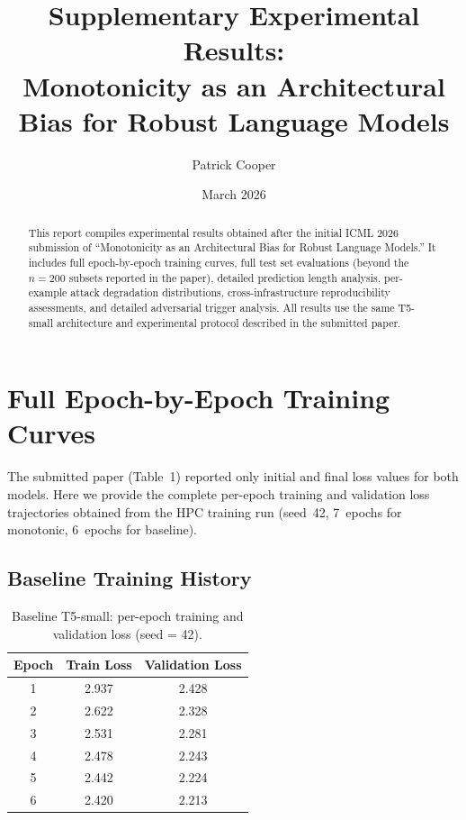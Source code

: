 \documentclass{article}
\title{Supplementary Experimental Results:\\Monotonicity as an Architectural Bias for Robust Language Models}
\author{Patrick Cooper}
\date{March 2026}
\begin{document}
\maketitle

\begin{abstract}
This report compiles experimental results obtained after the initial ICML 2026 submission of ``Monotonicity as an Architectural Bias for Robust Language Models.'' It includes full epoch-by-epoch training curves, full test set evaluations (beyond the $n=200$ subsets reported in the paper), detailed prediction length analysis, per-example attack degradation distributions, cross-infrastructure reproducibility assessments, and detailed adversarial trigger analysis. All results use the same T5-small architecture and experimental protocol described in the submitted paper.
\end{abstract}

\tableofcontents
\newpage

\section{Full Epoch-by-Epoch Training Curves}
\label{sec:training-curves}

The submitted paper (Table~1) reported only initial and final loss values for both models. Here we provide the complete per-epoch training and validation loss trajectories obtained from the HPC training run (seed~42, 7~epochs for monotonic, 6~epochs for baseline).

\subsection{Baseline Training History}

\begin{table}[h]
\caption{Baseline T5-small: per-epoch training and validation loss (seed = 42).}
\label{tab:baseline-history}
\centering
\begin{tabular}{ccc}
\toprule
Epoch & Train Loss & Validation Loss \\
\midrule
1 & 2.937 & 2.428 \\
2 & 2.622 & 2.328 \\
3 & 2.531 & 2.281 \\
4 & 2.478 & 2.243 \\
5 & 2.442 & 2.224 \\
6 & 2.420 & 2.213 \\
\bottomrule
\end{tabular}
\end{table}
\end{document}

